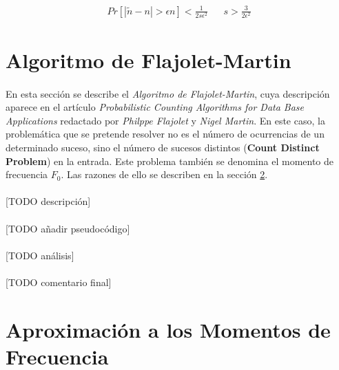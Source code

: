 \documentclass{subfiles}
\begin{document}
      \begin{align}
      \label{eq:morris+_bound}
        Pr[|\widetilde{n} - n| > \epsilon n ] < \frac{1}{2s\epsilon^2} && s > \frac{3}{2\epsilon^2}
      \end{align}



    \section{Algoritmo de Flajolet-Martin}
    \label{sec:streaming_morris_algorithm}

      \paragraph{}
      En esta sección se describe el \emph{Algoritmo de Flajolet-Martin}, cuya descripción aparece en el artículo \emph{Probabilistic Counting Algorithms for Data Base Applications} \cite{flajolet1985probabilistic} redactado por \emph{Philppe Flajolet} y \emph{Nigel Martin}. En este caso, la problemática que se pretende resolver no es el número de ocurrencias de un determinado suceso, sino el número de sucesos distintos (\textbf{Count Distinct Problem}) en la entrada. Este problema también se denomina el momento de frecuencia $F_0$. Las razones de ello se describen en la sección \ref{sec:streaming_frecuency_moment_aproximation}.

      \paragraph{}
      [TODO descripción]

      \paragraph{}
      [TODO añadir pseudocódigo]

      \paragraph{}
      [TODO análisis]

      \paragraph{}
      [TODO comentario final]


    \section{Aproximación a los Momentos de Frecuencia}
    \label{sec:streaming_frecuency_moment_aproximation}
\end{document}
